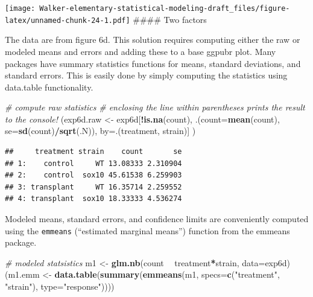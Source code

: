 \documentclass[]{book}
\newenvironment{Shaded}{\begin{snugshade}}{\end{snugshade}}
\newcommand{\KeywordTok}[1]{\textcolor[rgb]{0.13,0.29,0.53}{\textbf{#1}}}
\newcommand{\DataTypeTok}[1]{\textcolor[rgb]{0.13,0.29,0.53}{#1}}
\newcommand{\StringTok}[1]{\textcolor[rgb]{0.31,0.60,0.02}{#1}}
\newcommand{\CommentTok}[1]{\textcolor[rgb]{0.56,0.35,0.01}{\textit{#1}}}
\newcommand{\OperatorTok}[1]{\textcolor[rgb]{0.81,0.36,0.00}{\textbf{#1}}}
\newcommand{\NormalTok}[1]{#1}
\begin{document}
\texttt{[image: Walker-elementary-statistical-modeling-draft\_files/figure-latex/unnamed-chunk-24-1.pdf]}
\#\#\#\# Two factors

The data are from figure 6d. This solution requires computing either the
raw or modeled means and errors and adding these to a base ggpubr plot.
Many packages have summary statistics functions for means, standard
deviations, and standard errors. This is easily done by simply computing
the statistics using data.table functionality.

\begin{Shaded}
\begin{Highlighting}[]
\CommentTok{# compute raw statistics}
\CommentTok{# enclosing the line within parentheses prints the result to the console!}
\NormalTok{(exp6d.raw <-}\StringTok{ }\NormalTok{exp6d[}\OperatorTok{!}\KeywordTok{is.na}\NormalTok{(count), .(}\DataTypeTok{count=}\KeywordTok{mean}\NormalTok{(count),}
                       \DataTypeTok{se=}\KeywordTok{sd}\NormalTok{(count)}\OperatorTok{/}\KeywordTok{sqrt}\NormalTok{(.N)),}
                   \DataTypeTok{by=}\NormalTok{.(treatment, strain)]}
\NormalTok{)}
\end{Highlighting}
\end{Shaded}

\begin{verbatim}
##     treatment strain    count       se
## 1:    control     WT 13.08333 2.310904
## 2:    control  sox10 45.61538 6.259903
## 3: transplant     WT 16.35714 2.259552
## 4: transplant  sox10 18.33333 4.536274
\end{verbatim}

Modeled means, standard errors, and confidence limits are conveniently
computed using the \texttt{emmeans} (``estimated marginal means'')
function from the emmeans package.

\begin{Shaded}
\begin{Highlighting}[]
\CommentTok{# modeled statsistics}
\NormalTok{m1 <-}\StringTok{ }\KeywordTok{glm.nb}\NormalTok{(count }\OperatorTok{~}\StringTok{ }\NormalTok{treatment}\OperatorTok{*}\NormalTok{strain, }\DataTypeTok{data=}\NormalTok{exp6d)}
\NormalTok{(m1.emm <-}\StringTok{ }\KeywordTok{data.table}\NormalTok{(}\KeywordTok{summary}\NormalTok{(}\KeywordTok{emmeans}\NormalTok{(m1, }\DataTypeTok{specs=}\KeywordTok{c}\NormalTok{(}\StringTok{"treatment"}\NormalTok{, }\StringTok{"strain"}\NormalTok{), }\DataTypeTok{type=}\StringTok{"response"}\NormalTok{))))}
\end{Highlighting}
\end{Shaded}
\end{document}
